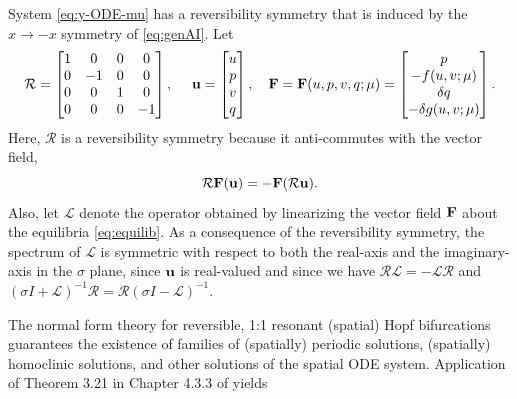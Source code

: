 \documentclass[11pt]{article}
\numberwithin{equation}{section}
\begin{document}
System \eqref{eq:y-ODE-mu} has a reversibility symmetry that is induced by the $x \to -x$ symmetry of \eqref{eq:genAI}. 
Let
\begin{align}
    \mathcal{R} = 
    \begin{bmatrix}
        1 & 0 & 0 & 0 \\
        0 & -1 & 0 & 0 \\ 
        0 & 0 & 1 & 0 \\
        0 & 0 & 0 & -1
    \end{bmatrix}, \ \ \ \
    {\bf u} =
    \begin{bmatrix}
        u \\ p \\ v \\ q
    \end{bmatrix}, \ \ \ 
    {\bf F} = {\bf F} (u,p,v,q;\mu) = 
    \begin{bmatrix}
          p \\
          -f(u,v;\mu)\\
          \delta q\\
          - \delta g(u,v;\mu) 
    \end{bmatrix}.
\end{align}
Here, $\mathcal{R}$ is a reversibility symmetry because it anti-commutes with the vector field,
\begin{equation}\label{reversibility}
    \mathcal{R} {\bf F} ({\bf u}) = - {\bf F}( \mathcal{R}{\bf u}).
\end{equation}
Also, let $\mathcal{L}$ denote the operator obtained by linearizing the vector field ${\bf F}$ about the equilibria \eqref{eq:equilib}.
As a consequence of the reversibility symmetry, the spectrum of $\mathcal{L}$ is symmetric with respect to both the real-axis and the imaginary-axis in the $\sigma$ plane, since ${\bf u}$ is real-valued and since we have $\mathcal{R}\mathcal{L} = - \mathcal{L} \mathcal{R}$ and $(\sigma I + \mathcal{L} )^{-1} \mathcal{R} = \mathcal{R} (\sigma I - \mathcal{L} )^{-1}$. 


The normal form theory for reversible, 1:1 resonant (spatial) Hopf bifurcations guarantees the existence of families of (spatially) periodic solutions, (spatially) homoclinic solutions, and other solutions of the spatial ODE system. 
Application of Theorem 3.21 in Chapter 4.3.3 of \cite{HI2011} yields
\end{document}

